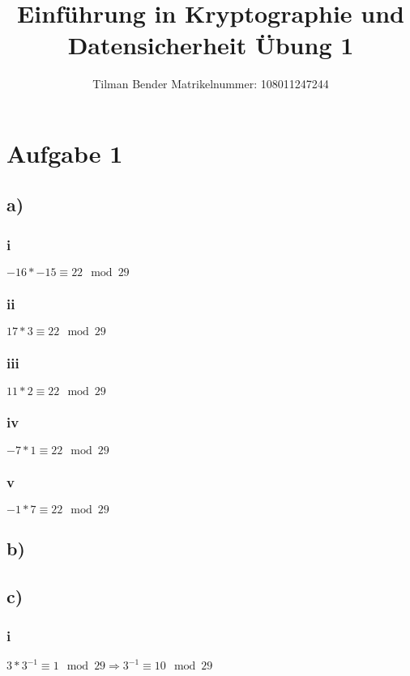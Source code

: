 \documentclass[10pt,a4paper]{article}
\author{Tilman Bender   Matrikelnummer: 108011247244\\}
\title{Einführung in Kryptographie und Datensicherheit Übung 1}
\begin{document}
\maketitle

\section*{Aufgabe 1}
\subsection*{a)}
\subsubsection*{i}	\begin{math} -16 * -15 \equiv 22 \mod 29 \end{math}
\subsubsection*{ii}	\begin{math} 17 * 3 \equiv 22 \mod 29 \end{math}
\subsubsection*{iii}	\begin{math} 11 * 2  \equiv 22 \mod 29 \end{math}
\subsubsection*{iv}	\begin{math}  -7 * 1 \equiv 22 \mod 29 \end{math}
\subsubsection*{v}	\begin{math}  -1 * 7 \equiv 22 \mod 29 \end{math}
\subsection*{b)}

\subsection*{c)}
\subsubsection*{i}\begin{math}  3 * 3^{-1} \equiv 1 \mod 29 \Rightarrow 3^{-1} \equiv 10 \mod 29 \end{math}
\end{document}
